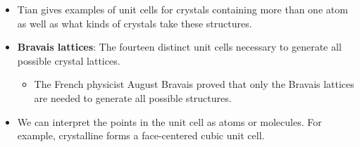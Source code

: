\documentclass[../notes.tex]{subfiles}
\begin{document}
\begin{itemize}
\begin{figure}[H]
        \caption{Unit cell.}
        \label{fig:unitCell}
    \end{figure}
    \begin{itemize}
        \item Opposite faces of a unit cell are parallel.
        \item The edge of the unit cell connects equivalent points.
        \item Unit cells all have the same general shape.
        \begin{itemize}
            \item We take the bottom left corner of the unit cell to be the origin of the \textbf{a}, \textbf{b}, \textbf{c} coordinate system.
            \item The unit cell is defined by the distances $a$, $b$, and $c$ (which give its length along the \textbf{a}, \textbf{b}, and \textbf{c} axes, respectively) and the angles $\alpha$, $\beta$, and $\gamma$ (which lie between the three pairs of axes).
        \end{itemize}
        \item Note that henceforth unless stated otherwise, the \textbf{a} axis points to the right, the \textbf{b} axis points back, and the \textbf{c} axis points up, as in Figure \ref{fig:unitCell}.
    \end{itemize}
    \item Tian gives examples of unit cells for crystals containing more than one atom as well as what kinds of crystals take these structures.
    \item \textbf{Bravais lattices}: The fourteen distinct unit cells necessary to generate all possible crystal lattices.
    \begin{itemize}
        \item The French physicist August Bravais proved that only the Bravais lattices are needed to generate all possible structures.
    \end{itemize}
    \item We can interpret the points in the unit cell as atoms or molecules. For example, crystalline  forms a face-centered cubic unit cell.

\end{itemize}
\end{document}
